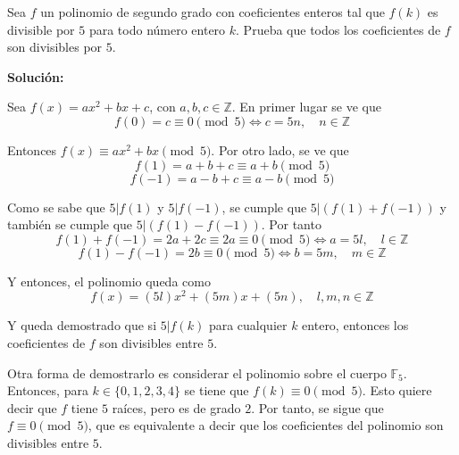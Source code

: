 \documentclass[../../main.tex]{subfiles}
\begin{document}
  \begin{shaded}
    Sea $f$ un polinomio de segundo grado con coeficientes enteros tal que $f(k)$ es divisible por $5$ para todo número entero $k$. Prueba que todos los coeficientes de $f$ son divisibles por $5$.
  \end{shaded}

  \textbf{Solución:}

  Sea $f(x) = a x^2 + b x + c$, con $a, b, c \in \mathbb{Z}$. En primer lugar se ve que
  $$
  f(0) = c \equiv 0 \pmod{5} \iff c = 5n, \quad n \in \mathbb{Z}
  $$

  Entonces $f(x) \equiv a x^2 + b x \pmod{5}$. Por otro lado, se ve que
  $$
  f(1) = a + b + c \equiv a + b \pmod{5}
  $$
  $$
  f(-1) = a - b + c \equiv a - b \pmod{5}
  $$

  Como se sabe que $5 | f(1)$ y $5 | f(-1)$, se cumple que $5 | (f(1) + f(-1))$ y también se cumple que $5 | (f(1) - f(-1))$. Por tanto
  $$
  f(1) + f(-1) = 2a + 2c \equiv 2a \equiv 0 \pmod{5} \iff a = 5l, \quad l \in \mathbb{Z}
  $$
  $$
  f(1) - f(-1) = 2b \equiv 0 \pmod{5} \iff b = 5m, \quad m \in \mathbb{Z}
  $$

  Y entonces, el polinomio queda como
  $$
  f(x) = (5l) x^2 + (5m) x + (5n), \quad l, m, n \in \mathbb{Z}
  $$

  Y queda demostrado que si $5 | f(k)$ para cualquier $k$ entero, entonces los coeficientes de $f$ son divisibles entre $5$.

  Otra forma de demostrarlo es considerar el polinomio sobre el cuerpo $\mathbb{F}_5$. Entonces, para $k \in \{0, 1, 2, 3, 4\}$ se tiene que $f(k) \equiv 0 \pmod{5}$. Esto quiere decir que $f$ tiene $5$ raíces, pero es de grado $2$. Por tanto, se sigue que $f \equiv 0 \pmod{5}$, que es equivalente a decir que los coeficientes del polinomio son divisibles entre $5$.
\end{document}

